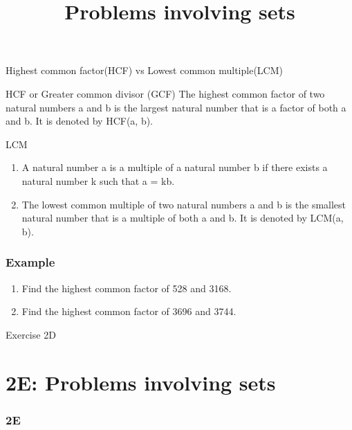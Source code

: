 \documentclass[
	11pt, %
]{beamer}
\begin{document}
\begin{frame}{Highest common factor(HCF) vs Lowest common multiple(LCM)}
    \begin{block}{HCF or Greater common divisor (GCF)}
        The highest common factor of two natural numbers a and b is the largest natural number
that is a factor of both a and b. It is denoted by HCF(a, b).
    \end{block}
    \begin{block}{LCM}
        \begin{enumerate}
            \item A natural number a is a multiple of a natural number b if there exists a natural
            number k such that a = kb.
            \item The lowest common multiple of two natural numbers a and b is the smallest natural
            number that is a multiple of both a and b. It is denoted by LCM(a, b).
        \end{enumerate}
    \end{block}
\end{frame}

\begin{frame}[t]
    \frametitle{Example}
    \begin{enumerate}
        \item Find the highest common factor of 528 and 3168.
        \item Find the highest common factor of 3696 and 3744.
    \end{enumerate}
\end{frame}
\begin{frame}
\end{frame}

\begin{frame}{Exercise 2D}
\end{frame}
\section{2E: Problems involving sets}
\begin{frame} 
    \frametitle{2E}
    \begin{center}
        \title{Problems involving sets}
        \maketitle
    \end{center}
\end{frame}
\end{document}
